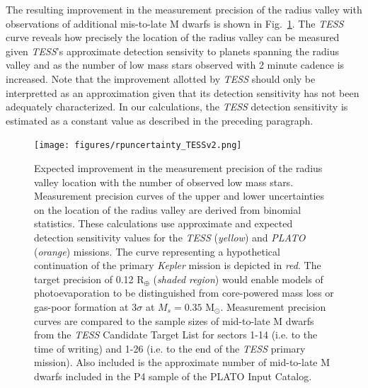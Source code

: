 \documentclass[twocolumn]{emulateapj}
\newcommand{\kepler}[1]{\emph{Kepler}#1}
\newcommand{\tess}[1]{\emph{TESS}#1}
\newcommand{\plato}[1]{\emph{PLATO}#1}
\begin{document}
The resulting improvement in the measurement precision of the radius valley with observations of additional mis-to-late
M dwarfs is shown in Fig.~\ref{fig:improve}.
The \tess{} curve reveals how precisely the location of the radius valley can be measured given \tess{'s} approximate 
detection sensivity to planets spanning the radius valley and as the number of low mass stars observed with 2 minute
cadence is increased. Note that the improvement allotted by \tess{} should only be interpretted as an
approximation given that its detection sensitivity has not been adequately characterized. In our calculations, the
\tess{} detection sensitivity is estimated as a constant value as described in the preceding paragraph. 

\begin{figure}
  \centering
  \texttt{[image: figures/rpuncertainty\_TESSv2.png]}
  \caption{Expected improvement in the measurement precision of the radius valley location with the number of observed
    low mass stars. Measurement precision curves of the upper and lower uncertainties on the location of the radius valley 
    are derived from binomial statistics. These calculations use approximate and expected detection sensitivity
    values for the \tess{} (\emph{yellow}) and \plato{} (\emph{orange}) missions. The curve representing a hypothetical continuation
    of the primary \kepler{} mission is depicted in \emph{red}. The target precision of 0.12 R$_{\oplus}$ (\emph{shaded region})
    would enable models of photoevaporation to be distinguished from core-powered mass loss or gas-poor formation at $3\sigma$
    at $M_s=0.35$ M$_{\odot}$. Measurement precision curves are compared to the sample sizes of mid-to-late M dwarfs from the \tess{}
    Candidate Target List for sectors 1-14 (i.e. to the time of writing) and 1-26 (i.e. to the end of the \tess{} primary
    mission). Also included is the approximate number of mid-to-late M dwarfs included in the P4 sample of the
    PLATO Input Catalog.}
  \label{fig:improve}
\end{figure}
\end{document}
